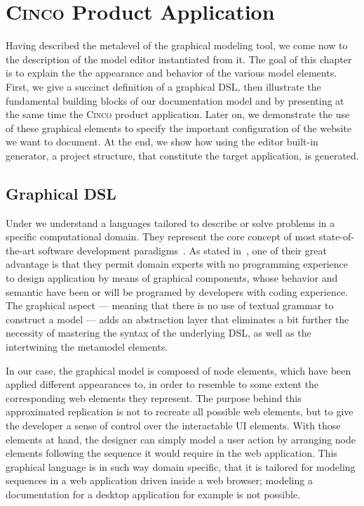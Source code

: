 \chapter{\textsc{Cinco} Product Application}\label{ch:CP}

Having described the metalevel of the graphical modeling tool, we come now to the description of the model editor instantiated from it. The goal of this chapter is to explain the the appearance and behavior of the various model elements. First, we give a succinct definition of a graphical DSL, then illustrate the fundamental building blocks of our documentation model and by presenting at the same time the \textsc{Cinco} product application. Later on, we demonstrate the use of these graphical elements to specify the important configuration of the website we want to document. At the end, we show how using the editor built-in generator, a project structure, that constitute the target application, is generated.

\section{Graphical DSL}\label{sec:gDSL}

Under  we understand a languages tailored to describe or solve problems in a specific computational domain. They represent the core concept of most state-of-the-art software development paradigms~\cite{perez-et_al}. As stated in~\cite{Naujokat2018}, one of their great advantage is that they permit domain experts with no programming experience to design application by means of graphical components, whose behavior and semantic have been or will be programed by developers with coding experience. The graphical aspect --- meaning that there is no use of textual grammar to construct a model --- adds an abstraction layer that eliminates a bit further the necessity of mastering the syntax of the underlying DSL, as well as the  intertwining the metamodel elements.

In our case, the graphical model is composed of node elements, which have been applied different appearances to, in order to resemble to some extent the corresponding web elements they represent. The purpose behind this approximated replication is not to recreate all possible web elements, but to give the developer a sense of control over the interactable UI elements. With those elements at hand, the designer can simply model a user action by arranging node elements following the sequence it would require in the web application. This graphical language is in such way domain specific, that it is tailored for modeling sequences in a web application driven inside a web browser; modeling a documentation for a desktop application for example is not possible.

